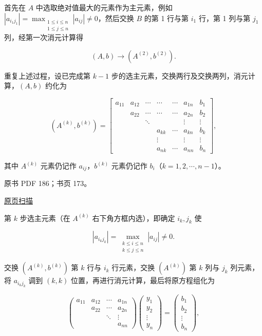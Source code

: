 \documentclass[
  10pt,
  fontset=fandol]{ctexart}
\begin{document}
首先在 \(A\) 中选取绝对值最大的元素作为主元素，例如 \(|a_{i_1j_1}|=\max_{\substack{1\le i\le n\\1\le j\le n}}|a_{ij}|\ne0\)，然后交换 \(B\) 的第 1 行与第 \(i_1\) 行，第 1 列与第 \(j_1\) 列，经第一次消元计算得

\[(A,b)\to(A^{(2)},b^{(2)}).\]

重复上述过程，设已完成第 \(k-1\) 步的选主元素，交换两行及交换两列，消元计算，\((A,b)\) 约化为

\[
(A^{(k)},b^{(k)})=\left[\begin{array}{cccccc|c}
a_{11}&a_{12}&\cdots&\cdots&\cdots&a_{1n}&b_1\\
&a_{22}&\cdots&\cdots&\cdots&a_{2n}&b_2\\
&&\ddots&&&\vdots&\vdots\\
&&&a_{kk}&\cdots&a_{kn}&b_k\\
&&&\vdots&&\vdots&\vdots\\
&&&a_{nk}&\cdots&a_{nn}&b_n
\end{array}\right],
\]

其中 \(A^{(k)}\) 元素仍记作 \(a_{ij}\)，\(b^{(k)}\) 元素仍记作 \(b_i\)（\(k=1,2,\cdots,n-1\)）。

\clearpage

原书 PDF 186；书页 173。

\href{../../../source-images/pdf-186.jpeg}{原页扫描}

第 \(k\) 步选主元素（在 \(A^{(k)}\) 右下角方框内选），即确定 \(i_k,j_k\) 使

\[|a_{i_kj_k}|=\max_{\substack{k\le i\le n\\k\le j\le n}}|a_{ij}|\ne0.\]

交换 \((A^{(k)},b^{(k)})\) 第 \(k\) 行与 \(i_k\) 行元素，交换 \((A^{(k)})\) 第 \(k\) 列与 \(j_k\) 列元素，将 \(a_{i_kj_k}\) 调到 \((k,k)\) 位置，再进行消元计算，最后将原方程组化为

\[
\begin{pmatrix}
a_{11}&a_{12}&\cdots&a_{1n}\\
&a_{22}&\cdots&a_{2n}\\
&&\ddots&\vdots\\
&&&a_{nn}
\end{pmatrix}
\begin{pmatrix}y_1\\y_2\\\vdots\\y_n\end{pmatrix}
=\begin{pmatrix}b_1\\b_2\\\vdots\\b_n\end{pmatrix},
\]
\end{document}
